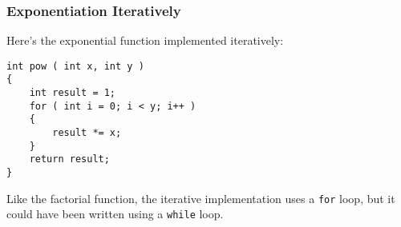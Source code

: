 \begin{frame}[fragile]
\frametitle{Exponentiation Iteratively}
Here's the exponential function implemented iteratively:

\begin{verbatim}
int pow ( int x, int y )
{
    int result = 1;
    for ( int i = 0; i < y; i++ )
    {
        result *= x;
    }
    return result;
}
\end{verbatim}

Like the factorial function, the iterative implementation uses a \texttt{for} loop, but it could have been written using a \texttt{while} loop.

\end{frame}



